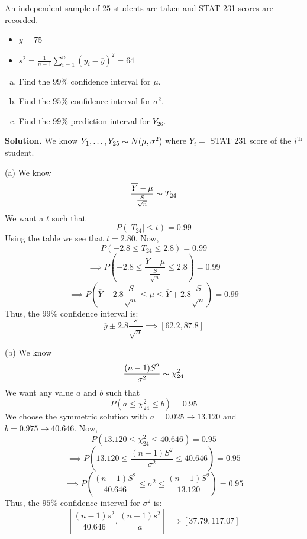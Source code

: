 \begin{exbox}
    \begin{example}
        An independent sample of $ 25 $ students are taken and STAT 231 scores are recorded.
        \begin{itemize}
            \item $ \overline{y}=75 $
            \item $ s^2=\frac{1}{n-1} \sum\limits_{i=1}^{n} (y_i-\overline{y})^2=64 $
        \end{itemize}
        \begin{enumerate}[(a)]
            \item Find the $ 99\% $ confidence interval for $ \mu $.
            \item Find the $ 95\% $ confidence interval for $ \sigma^2 $.
            \item Find the $ 99\% $ prediction interval for $ Y_{26} $.
        \end{enumerate}
        \textbf{Solution.} We know $ Y_1,\ldots ,Y_{25} \thicksim N(\mu,\sigma^2) $
        where $ Y_i= $ STAT 231 score of the $ i^{\text{th}} $ student.

        (a) We know
        \[ \frac{\overline{Y}-\mu}{\frac{S}{\sqrt{n}}} \thicksim T_{24} \]
        We want a $ t $ such that
        \[ P(|T_{24}|\leqslant t)=0.99 \]
        Using the table we see that $ t=2.80 $. Now,
        \[ P(-2.8\leqslant T_{24}\leqslant 2.8)=0.99 \]
        \[ \implies P\left(-2.8\leqslant \frac{\overline{Y}-\mu}{\frac{S}{\sqrt{n}}}
            \leqslant 2.8\right)=0.99 \]
        \[ \implies P\left(\overline{Y}-2.8 \frac{S}{\sqrt{n}}\leqslant \mu\leqslant \overline{Y}+
            2.8 \frac{S}{\sqrt{n}}\right)=0.99 \]
        Thus, the $ 99\% $ confidence interval is:
        \[ \overline{y}\pm 2.8 \frac{s}{\sqrt{n}}\implies \left[ 62.2, 87.8 \right] \]

        (b) We know
        \[ \frac{(n-1)S^2}{\sigma^2} \thicksim \chi^2_{24}  \]
        We want any value $ a $ and $ b $ such that
        \[ P(a\leqslant \chi^2_{24}\leqslant b)=0.95 \]
        We choose the symmetric solution with $ a=0.025\rightarrow 13.120 $ and $ b=0.975\rightarrow 40.646 $.
        Now,
        \[ P\left( 13.120\leqslant \chi^2_{24}\leqslant 40.646 \right)=0.95 \]
        \[ \implies P\left( 13.120\leqslant \frac{(n-1) S^2}{\sigma^2}\leqslant 40.646 \right)=0.95 \]
        \[ \implies P\left( \frac{(n-1)S^2}{40.646}\leqslant \sigma^2 \leqslant \frac{(n-1)S^2}{13.120} \right)=0.95 \]
        Thus, the $ 95\% $ confidence interval for $ \sigma^2 $ is:
        \[ \left[ \frac{(n-1)s^2}{40.646} , \frac{(n-1)s^2}{a} \right]\implies
            \left[ 37.79, 117.07 \right] \]


\end{example}
\end{exbox}
